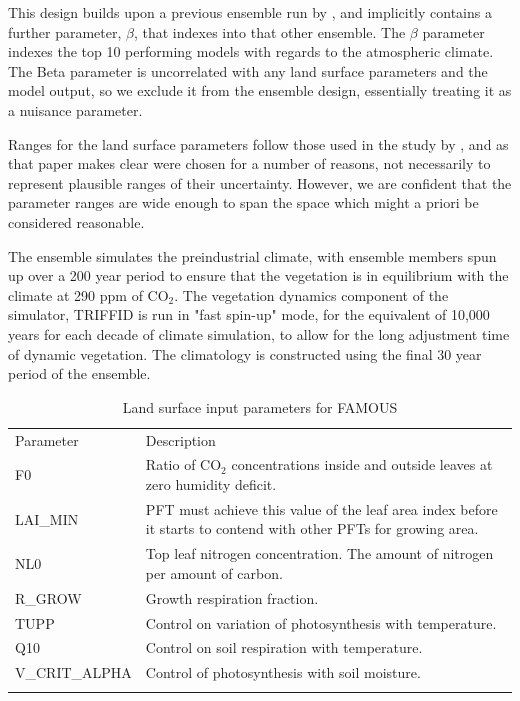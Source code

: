 \documentclass[esd, article]{copernicus} %
\begin{document}
This design builds upon a previous ensemble run by \cite{gregoire2010optimal}, and implicitly contains a further parameter, $\beta$, that indexes into that other ensemble. The $\beta$ parameter indexes the top 10 performing models with regards to the atmospheric climate. The Beta parameter is uncorrelated with any land surface parameters and the model output, so we exclude it from the ensemble design, essentially treating it as a nuisance parameter.

Ranges for the land surface parameters follow those used in the study by \cite{booth2012highsensitivity}, and as that paper makes clear were chosen for a number of reasons, not necessarily to represent plausible ranges of their uncertainty. However, we are confident that the parameter ranges are wide enough to span the space which might a priori be considered reasonable.

The ensemble simulates the preindustrial climate, with ensemble members spun up over a 200 year period to ensure that the vegetation is in equilibrium with the climate at 290 ppm of CO$_{2}$. The vegetation dynamics component of the simulator, TRIFFID is run in "fast spin-up" mode, for the equivalent of 10,000 years for each decade of climate simulation, to allow for the long adjustment time of dynamic vegetation. The climatology is constructed using the final 30 year period of the ensemble. 


\begin{table}[t]
\caption{Land surface input parameters for FAMOUS}\label{tab:params}
\begin{tabular}{ll}

\tophline
Parameter &  Description \\
F0              &    Ratio of CO$_2$ concentrations inside and outside leaves at zero humidity deficit. \\
LAI\_MIN    &      PFT must achieve this value of the leaf area index before it starts to contend with other PFTs for growing area. \\
NL0           &      Top leaf nitrogen concentration. The amount of nitrogen per amount of carbon. \\
R\_GROW    &       Growth respiration fraction. \\
TUPP        &    Control on variation of photosynthesis with temperature. \\
Q10           &     Control on soil respiration with temperature. \\
V\_CRIT\_ALPHA  & Control of photosynthesis with soil moisture. \\
\bottomhline
\end{tabular}
\belowtable{} %
\end{table}
\end{document}
